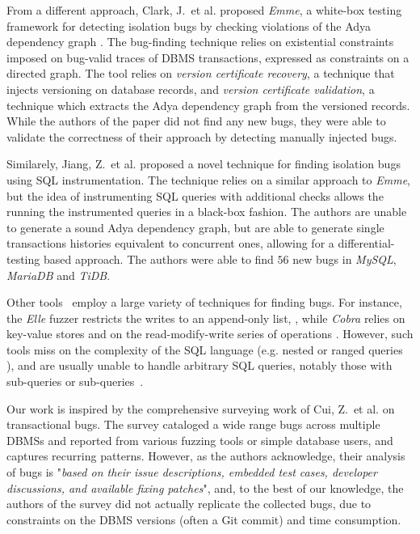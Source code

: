 From a different approach, Clark, J.\ et al. \cite{clark2024validating} proposed \textit{Emme}, a white-box testing framework for detecting isolation bugs by checking violations of the Adya dependency graph \cite{adya1999weak}. The bug-finding technique relies on existential constraints imposed on bug-valid traces of DBMS transactions, expressed as constraints on a directed graph. The tool relies on \textit{version certificate recovery}, a technique that injects versioning on database records, and \textit{version certificate validation}, a technique which extracts the Adya dependency graph from the versioned records. While the authors of the paper did not find any new bugs, they were able to validate the correctness of their approach by detecting manually injected bugs.

Similarely, Jiang, Z.\ et al. \cite{jiang2023detecting} proposed a novel technique for finding isolation bugs using SQL instrumentation. The technique relies on a similar approach to \textit{Emme}, but the idea of instrumenting SQL queries with additional checks allows the running the instrumented queries in a black-box fashion. The authors are unable to generate a sound Adya dependency graph, but are able to generate single transactions histories equivalent to concurrent ones, allowing for a differential-testing based approach. The authors were able to find $56$ new bugs in \textit{MySQL}, \textit{MariaDB} and \textit{TiDB}.

Other tools~\cite{kingsbury2020elle,tan2020cobra,viper,polysi,plume,isovista,cat} employ a large variety of techniques for finding bugs.
For instance,
the \textit{Elle} fuzzer restricts the writes to an append-only list, \cite{kingsbury2020elle}, while \textit{Cobra} relies on key-value stores and on the read-modify-write series of operations \cite{tan2020cobra}. However, such tools miss on the complexity of the SQL language (e.g. nested or ranged queries \cite{jiang2023dynsql}), and are usually unable to handle arbitrary SQL queries, notably those with sub-queries or sub-queries~\cite{levy1994query}.

Our work is inspired by the comprehensive surveying work of Cui, Z.\ et al. \cite{cui2024understanding_ICSE2024} on transactional bugs. The survey cataloged a wide range bugs across multiple DBMSs and reported from various fuzzing tools or simple database users, and captures recurring patterns. However, as the authors acknowledge, their analysis of bugs is "\textit{based on their issue descriptions, embedded test cases, developer discussions, and available fixing patches}", and, to the best of our knowledge, the authors of the survey did not actually replicate the collected bugs, due to constraints on the DBMS versions (often a Git commit) and time consumption.

